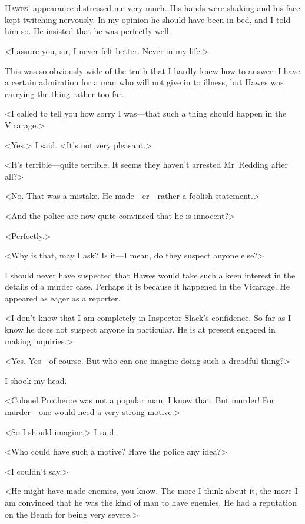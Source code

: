 \chapter[Chapter  \thechapter]{}


\lettrine{H}{awes'} appearance distressed me very much. His hands were shaking and his face kept twitching nervously. In my opinion he should have been in bed, and I told him so. He insisted that he was perfectly well.

<I assure you, sir, I never felt better. Never in my life.>

This was so obviously wide of the truth that I hardly knew how to answer. I have a certain admiration for a man who will not give in to illness, but Hawes was carrying the thing rather too far.

<I called to tell you how sorry I was—that such a thing should happen in the Vicarage.>

<Yes,> I said. <It's not very pleasant.>

<It's terrible—quite terrible. It seems they haven't arrested Mr~Redding after all?>

<No. That was a mistake. He made—er—rather a foolish statement.>

<And the police are now quite convinced that he is innocent?>

<Perfectly.>

<Why is that, may I ask? Is it—I mean, do they suspect anyone else?>

I should never have suspected that Hawes would take such a keen interest in the details of a murder case. Perhaps it is because it happened in the Vicarage. He appeared as eager as a reporter.

<I don't know that I am completely in Inspector Slack's confidence. So far as I know he does not suspect anyone in particular. He is at present engaged in making inquiries.>

<Yes. Yes—of course. But who can one imagine doing such a dreadful thing?>

I shook my head.

<Colonel Protheroe was not a popular man, I know that. But murder! For murder—one would need a very strong motive.>

<So I should imagine,> I said.

<Who could have such a motive? Have the police any idea?>

<I couldn't say.>

<He might have made enemies, you know. The more I think about it, the more I am convinced that he was the kind of man to have enemies. He had a reputation on the Bench for being very severe.>

